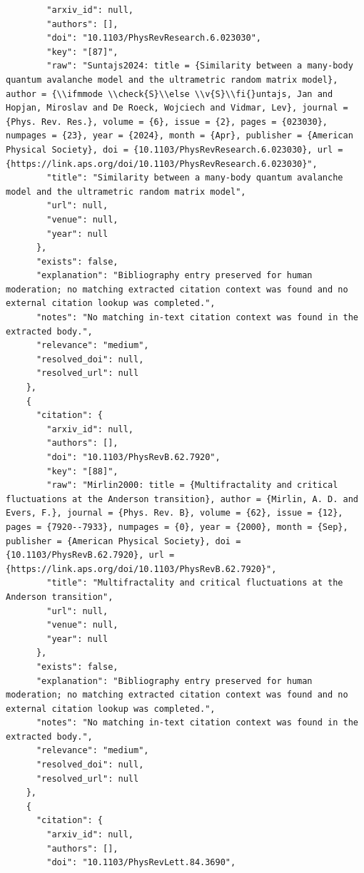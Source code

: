 \documentclass[11pt]{article}
\begin{document}
\begin{verbatim}
        "arxiv_id": null,
        "authors": [],
        "doi": "10.1103/PhysRevResearch.6.023030",
        "key": "[87]",
        "raw": "Suntajs2024: title = {Similarity between a many-body quantum avalanche model and the ultrametric random matrix model}, author = {\\ifmmode \\check{S}\\else \\v{S}\\fi{}untajs, Jan and Hopjan, Miroslav and De Roeck, Wojciech and Vidmar, Lev}, journal = {Phys. Rev. Res.}, volume = {6}, issue = {2}, pages = {023030}, numpages = {23}, year = {2024}, month = {Apr}, publisher = {American Physical Society}, doi = {10.1103/PhysRevResearch.6.023030}, url = {https://link.aps.org/doi/10.1103/PhysRevResearch.6.023030}",
        "title": "Similarity between a many-body quantum avalanche model and the ultrametric random matrix model",
        "url": null,
        "venue": null,
        "year": null
      },
      "exists": false,
      "explanation": "Bibliography entry preserved for human moderation; no matching extracted citation context was found and no external citation lookup was completed.",
      "notes": "No matching in-text citation context was found in the extracted body.",
      "relevance": "medium",
      "resolved_doi": null,
      "resolved_url": null
    },
    {
      "citation": {
        "arxiv_id": null,
        "authors": [],
        "doi": "10.1103/PhysRevB.62.7920",
        "key": "[88]",
        "raw": "Mirlin2000: title = {Multifractality and critical fluctuations at the Anderson transition}, author = {Mirlin, A. D. and Evers, F.}, journal = {Phys. Rev. B}, volume = {62}, issue = {12}, pages = {7920--7933}, numpages = {0}, year = {2000}, month = {Sep}, publisher = {American Physical Society}, doi = {10.1103/PhysRevB.62.7920}, url = {https://link.aps.org/doi/10.1103/PhysRevB.62.7920}",
        "title": "Multifractality and critical fluctuations at the Anderson transition",
        "url": null,
        "venue": null,
        "year": null
      },
      "exists": false,
      "explanation": "Bibliography entry preserved for human moderation; no matching extracted citation context was found and no external citation lookup was completed.",
      "notes": "No matching in-text citation context was found in the extracted body.",
      "relevance": "medium",
      "resolved_doi": null,
      "resolved_url": null
    },
    {
      "citation": {
        "arxiv_id": null,
        "authors": [],
        "doi": "10.1103/PhysRevLett.84.3690",

\end{verbatim}
\end{document}
